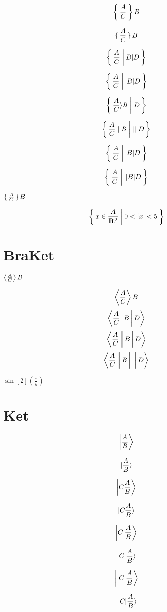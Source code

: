 \documentclass{article}
\begin{document}
\[\Set{\frac{A}{C}}{B}\]

\[\set{\frac{A}{C}}{B}\]

\[\Set{\frac{A}{C} | B | D}\]

\[\Set{\frac{A}{C} \| B | D}\]

\[\Set{\frac{A}{C} \rangle B | D}\]

\[\Set{\frac{A}{C} \mid B | \parallel D}\]

\[\Set{\frac{A}{C} || B | D}\]

\[\Set{\frac{A}{C} ||| B | D}\]

$\set{\frac{A}{C}}{B}$

\[\Set{ x\in\frac{A}{\mathbf{R}^2} | 0<{|x|}<5 }\]



\newpage
\section*{BraKet}
$\Braket{\frac{A}{C}}{B}$

\[\Braket{\frac{A}{C}}{B}\]
\[\Braket{\frac{A}{C} | B | D}\]
\[\Braket{\frac{A}{C} || B | D}\]
\[\Braket{\frac{A}{C} || B ||| D}\]

$\sin[2](\frac{x}{y})$

\newpage
\section*{Ket}
\[\Ket{\frac{A}{B}}\]

\[\ket{\frac{A}{B}}\]

\[\Ket{C\frac{A}{B}}\]

\[\ket{C\frac{A}{B}}\]

\[\Ket{C|\frac{A}{B}}\]

\[\ket{C|\frac{A}{B}}\]

\[\Ket{|C|\frac{A}{B}}\]

\[\ket{|C|\frac{A}{B}}\]
\end{document}
